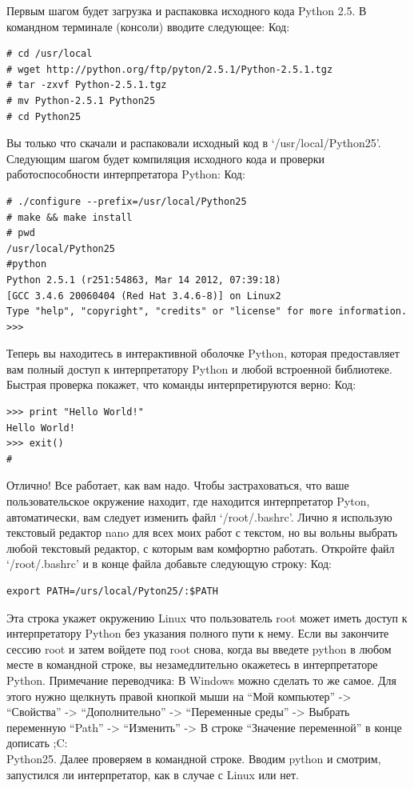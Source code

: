 \documentclass[12pt]{book}
\begin{document}
Первым шагом будет загрузка и распаковка исходного кода Python 2.5. В командном терминале (консоли) вводите следующее:
Код:
\begin{lstlisting}
# cd /usr/local
# wget http://python.org/ftp/pyton/2.5.1/Python-2.5.1.tgz
# tar -zxvf Python-2.5.1.tgz
# mv Python-2.5.1 Python25
# cd Python25
\end{lstlisting}
Вы только что скачали и распаковали исходный код в `/usr/local/Python25'. Следующим шагом будет компиляция исходного кода и проверки работоспособности интерпретатора Python:
Код:
\begin{lstlisting}
# ./configure --prefix=/usr/local/Python25
# make && make install
# pwd
/usr/local/Python25
#python
Python 2.5.1 (r251:54863, Mar 14 2012, 07:39:18)
[GCC 3.4.6 20060404 (Red Hat 3.4.6-8)] on Linux2
Type "help", "copyright", "credits" or "license" for more information.
>>>
\end{lstlisting}
Теперь вы находитесь в интерактивной оболочке Python, которая предоставляет вам полный доступ к интерпретатору Python и любой встроенной библиотеке. Быстрая проверка покажет, что команды интерпретируются верно:
Код:
\begin{lstlisting}
>>> print "Hello World!"
Hello World!
>>> exit()
#
\end{lstlisting}
Отлично! Все работает, как вам надо. Чтобы застраховаться, что ваше пользовательское окружение находит, где находится интерпретатор Pyton, автоматически, вам следует изменить файл `/root/.bashrc'. Лично я использую текстовый редактор nano для всех моих работ с текстом, но вы вольны выбрать любой текстовый редактор, с которым вам комфортно работать. Откройте файл `/root/.bashrc' и в конце файла добавьте следующую строку:
Код:
\begin{lstlisting}
export PATH=/urs/local/Pyton25/:$PATH
\end{lstlisting}
Эта строка укажет окружению Linux что пользователь root может иметь доступ к интерпретатору Python без указания полного пути к нему. Если вы закончите сессию root и затем войдете под root снова, когда вы введете python в любом месте в командной строке, вы незамедлительно окажетесь в интерпретаторе Python.
Примечание переводчика: В Windows можно сделать то же самое. Для этого нужно щелкнуть правой кнопкой мыши на ``Мой компьютер'' -> ``Свойства'' -> ``Дополнительно'' -> ``Переменные среды'' -> Выбрать переменную ``Path'' -> ``Изменить'' -> В строке ``Значение переменной'' в конце дописать ;C:\\Python25. Далее проверяем в командной строке. Вводим python и смотрим, запустился ли интерпретатор, как в случае с Linux или нет.
\end{document}
